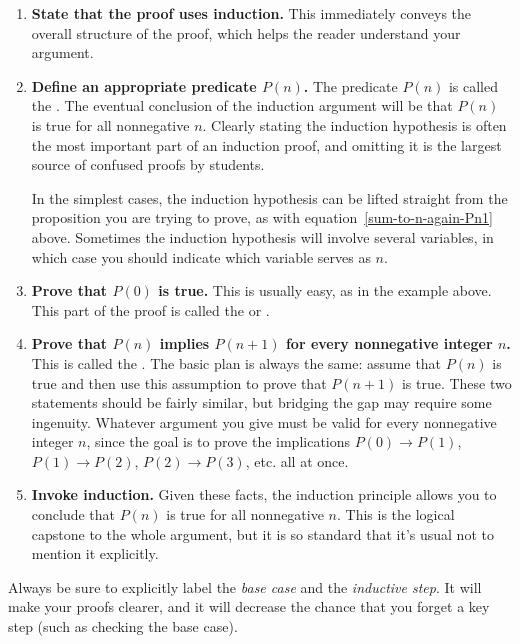 \begin{enumerate}

\item \textbf{State that the proof uses induction.}  This immediately
conveys the overall structure of the proof, which helps the reader
understand your argument.

\item \textbf{Define an appropriate predicate $P(n)$.}  The predicate $P(n)$ is 
called the .  The eventual conclusion of
the induction argument will be that $P(n)$ is true for all nonnegative
$n$.  Clearly stating the induction hypothesis is often the most
important part of an induction proof, and omitting it is the largest
source of confused proofs by students.

In the simplest cases, the induction hypothesis can be lifted straight
from the proposition you are trying to prove, as with
equation~\eqref{sum-to-n-again-Pn1} above.  Sometimes the induction
hypothesis will involve several variables, in which case you should
indicate which variable serves as $n$.

\item \textbf{Prove that $P(0)$ is true.}  This is usually easy, as in the
  example above.  This part of the proof is called the 
  or .\iffalse
  (Sometimes the base case will be $n=1$ or even
  some larger number, in which case the starting value of $n$ also should
  be stated.)\fi

\item \textbf{Prove that $P(n)$ implies $P(n+1)$ for every nonnegative
    integer $n$.}  This is called the .  The basic
  plan is always the same: assume that $P(n)$ is true and then use this
  assumption to prove that $P(n+1)$ is true.  These two statements should
  be fairly similar, but bridging the gap may require some ingenuity.
  Whatever argument you give must be valid for every nonnegative integer
  $n$, since the goal is to prove the implications $P(0) \rightarrow
  P(1)$, $P(1) \rightarrow P(2)$, $P(2) \rightarrow P(3)$, etc. all at
  once.

\item \textbf{Invoke induction.}  Given these facts, the induction
  principle allows you to conclude that $P(n)$ is true for all nonnegative
  $n$.  This is the logical capstone to the whole argument, but it is so
  standard that it's usual not to mention it explicitly.

\end{enumerate}
%
Always be sure to explicitly label the \emph{base case} and
the \emph{inductive step}.  It will make your proofs clearer, and it
will decrease the chance that you forget a key step (such as checking
the base case).

